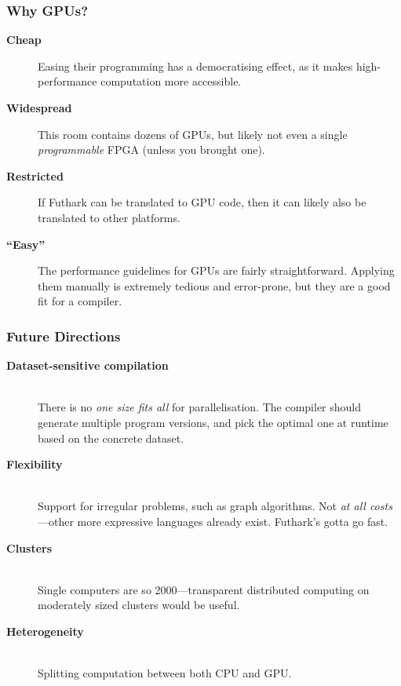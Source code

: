 \documentclass[rgb,dvipsnames]{beamer}
\begin{document}
\begin{frame}
  \frametitle{Why GPUs?}

  \begin{description}
  \item[\textbf{Cheap}] Easing their programming has a democratising effect, as
    it makes high-performance computation more accessible.
  \item[\textbf{Widespread}] This room contains dozens of GPUs, but likely not
    even a single \textit{programmable} FPGA (unless you brought one).
  \item[\textbf{Restricted}] If Futhark can be translated to GPU
    code, then it can likely also be translated to other platforms.
  \item[\textbf{``Easy''}] The performance guidelines for GPUs are
    fairly straightforward.  Applying them manually is extremely
    tedious and error-prone, but they are a good fit for a compiler.
  \end{description}
\end{frame}

\begin{frame}
  \frametitle{Future Directions}

  \begin{description}
  \item[\textbf{Dataset-sensitive compilation}]\hfill\\
    There is no \textit{one size fits all} for parallelisation.  The
    compiler should generate multiple program versions, and pick the
    optimal one at runtime based on the concrete dataset.
  \item[\textbf{Flexibility}]\hfill\\ Support for irregular problems, such as graph
    algorithms.  Not \textit{at all costs}---other more expressive
    languages already exist.  Futhark's gotta go fast.
  \item[\textbf{Clusters}]\hfill\\ Single computers are so 2000---transparent
    distributed computing on moderately sized clusters would be
    useful.
  \item[\textbf{Heterogeneity}]\hfill\\ Splitting computation between
    both CPU and GPU.
  \end{description}
\end{frame}
\end{document}
